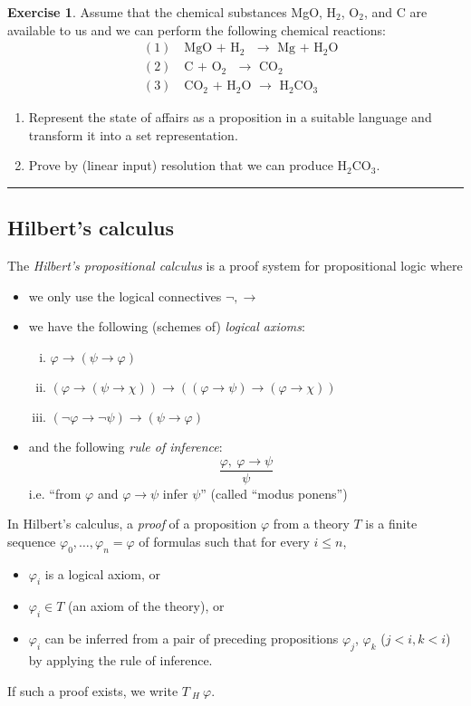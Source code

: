 \documentclass{amsart}
\theoremstyle{definition}
\newtheorem{problem}{Exercise}
\begin{document}
\begin{problem}Assume that the chemical substances MgO, H$_2$, O$_2$, and C are available to us and we can perform the following chemical reactions:
\begin{align*}&(1)\quad\text{MgO\ +\ H$_2$\ \ $\to$\ \ Mg\ +\ H$_2$O}\\
&(2)\quad\text{C\ +\ O$_2$\ \ $\to$\ \ CO$_2$}\\
&(3)\quad\text{CO$_2$\ +\ H$_2$O\ \ $\to$\ \ H$_2$CO$_3$}
\end{align*}
\begin{enumerate}
\item Represent the state of affairs as a proposition in a suitable language and transform it into a set representation.
\item Prove by (linear input) resolution that we can produce H$_2$CO$_3$.
\end{enumerate}
\end{problem}\medskip


\bigskip \hrule

\subsection*{Hilbert's calculus}
The \emph{Hilbert's propositional calculus} is a proof system for propositional logic where 
\begin{itemize}
    \item we only use the logical connectives $\neg,\to$
    \item we have the following (schemes of) \emph{logical axioms}:
    \begin{enumerate}[(i)]
        \item $\varphi \to (\psi \to \varphi)$
        \item $(\varphi\to (\psi \to \chi)) \to ((\varphi \to \psi)\to(\varphi \to \chi))$
        \item $(\neg \varphi \to \neg \psi)\to(\psi \to \varphi)$
    \end{enumerate}
    \item and the following \emph{rule of inference}:
    $$\frac{\varphi,\ \varphi \to \psi}{\psi}$$
    i.e. ``from $\varphi$ and $\varphi\to\psi$ infer $\psi$'' (called ``modus ponens'')
\end{itemize}
In Hilbert's calculus, a \emph{proof} of a proposition $\varphi$ from a theory $T$ is a finite sequence $\varphi_0,\dots,\varphi_n=\varphi$ of formulas such that for every $i\leq n$,
\begin{itemize}
\item $\varphi_i$ is a logical axiom, or 
\item $\varphi_i \in T$ (an axiom of the theory), or
\item $\varphi_i$ can be inferred from a pair of preceding propositions $\varphi_j$, $\varphi_k$ ($j<i,k<i$) by applying the rule of inference.
\end{itemize}
If such a proof exists, we write $T\ _H\ \varphi$.
\end{document}
